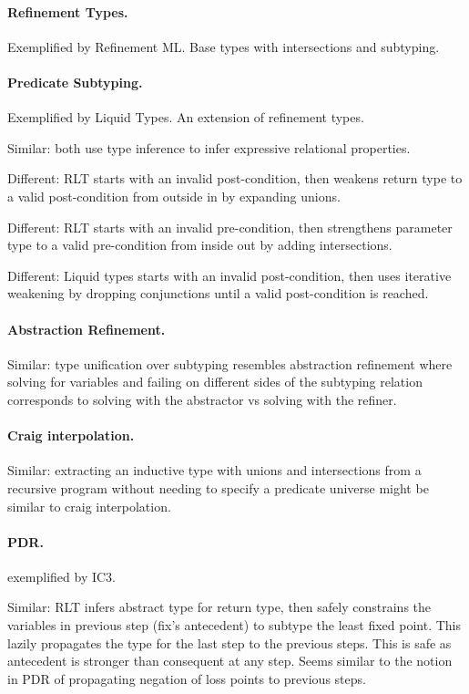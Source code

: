 \documentclass[acmsmall]{acmart}
\begin{document}
\paragraph{Refinement Types.}
Exemplified by Refinement ML. Base types with intersections and subtyping.

\paragraph{Predicate Subtyping.}
Exemplified by Liquid Types. An extension of refinement types.

Similar: both use type inference to infer expressive relational properties. 

Different: RLT starts with an invalid post-condition, then weakens return type to a valid post-condition from outside in by expanding unions.

Different: RLT starts with an invalid pre-condition, then strengthens parameter type to a valid pre-condition from inside out by adding intersections.

Different: Liquid types starts with an invalid post-condition, then uses iterative weakening by dropping conjunctions until a valid post-condition is reached.


\paragraph{Abstraction Refinement.} 
Similar: type unification over subtyping resembles abstraction refinement  
where solving for variables and failing on different sides of the subtyping relation corresponds to
solving with the abstractor vs solving with the refiner.

\paragraph{Craig interpolation.} 
Similar: extracting an inductive type with unions and intersections 
from a recursive program without needing to specify a predicate universe might be similar to
craig interpolation.

\paragraph{PDR.}
exemplified by IC3. 

Similar: RLT infers abstract type for return type, 
then safely constrains the variables in previous step (fix's antecedent) 
to subtype the least fixed point.
This lazily propagates the type for the last step to the previous steps.
This is safe as antecedent is stronger than consequent at any step.
Seems similar to the notion in PDR of propagating negation of loss points to previous steps. 
\end{document}
